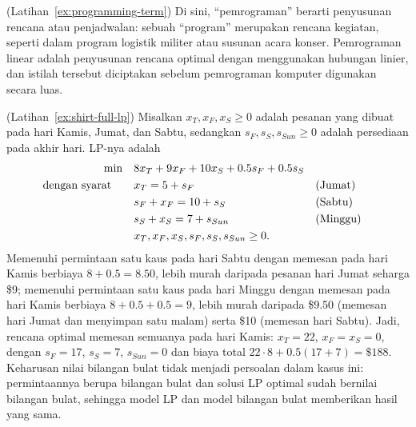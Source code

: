 \begin{solution}(Latihan~\ref{ex:programming-term})
Di sini, ``pemrograman'' berarti penyusunan rencana atau penjadwalan: sebuah ``program'' merupakan rencana kegiatan, seperti dalam program logistik militer atau susunan acara konser. Pemrograman linear adalah penyusunan rencana optimal dengan menggunakan hubungan linier, dan istilah tersebut diciptakan sebelum pemrograman komputer digunakan secara luas.
\end{solution}

\begin{solution}(Latihan~\ref{ex:shirt-full-lp})
Misalkan $x_T, x_F, x_S \geq 0$ adalah pesanan yang dibuat pada hari Kamis, Jumat, dan Sabtu, sedangkan $s_F, s_S, s_{Sun} \geq 0$ adalah persediaan pada akhir hari. LP-nya adalah
\begin{align*}
\min \quad & 8x_T + 9x_F + 10x_S + 0.5s_F + 0.5s_S\\
\mbox{dengan syarat}\quad \quad & x_T = 5 + s_F && \mbox{(Jumat)}\\
& s_F + x_F = 10 + s_S && \mbox{(Sabtu)}\\
& s_S + x_S = 7 + s_{Sun} && \mbox{(Minggu)}\\
& x_T, x_F, x_S, s_F, s_S, s_{Sun} \geq 0.
\end{align*}
Memenuhi permintaan satu kaus pada hari Sabtu dengan memesan pada hari Kamis berbiaya $8 + 0.5 = 8.50$, lebih murah daripada pesanan hari Jumat seharga \$9; memenuhi permintaan satu kaus pada hari Minggu dengan memesan pada hari Kamis berbiaya $8 + 0.5 + 0.5 = 9$, lebih murah daripada \$9.50 (memesan hari Jumat dan menyimpan satu malam) serta \$10 (memesan hari Sabtu). Jadi, rencana optimal memesan semuanya pada hari Kamis: $x_T = 22$, $x_F = x_S = 0$, dengan $s_F = 17$, $s_S = 7$, $s_{Sun} = 0$ dan biaya total $22 \cdot 8 + 0.5(17 + 7) = \$188$. Keharusan nilai bilangan bulat tidak menjadi persoalan dalam kasus ini: permintaannya berupa bilangan bulat dan solusi LP optimal sudah bernilai bilangan bulat, sehingga model LP dan model bilangan bulat memberikan hasil yang sama.
\end{solution}

%
%
%
